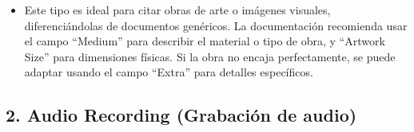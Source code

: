 \documentclass[
  jou,
  floatsintext,
  longtable,
  a4paper,
  nolmodern,
  notxfonts,
  notimes,
  colorlinks=true,linkcolor=blue,citecolor=blue,urlcolor=blue]{apa7}
\providecommand{\tightlist}{%
  \setlength{\itemsep}{0pt}\setlength{\parskip}{0pt}}
\begin{document}
\begin{itemize}
  \begin{itemize}
  \tightlist
  \item
    Este tipo es ideal para citar obras de arte o imágenes visuales,
    diferenciándolas de documentos genéricos. La documentación
    recomienda usar el campo ``Medium'' para describir el material o
    tipo de obra, y ``Artwork Size'' para dimensiones físicas. Si la
    obra no encaja perfectamente, se puede adaptar usando el campo
    ``Extra'' para detalles específicos.
  \end{itemize}
\end{itemize}

\subsection{2. Audio Recording (Grabación de
audio)}\label{audio-recording-grabaciuxf3n-de-audio}
\end{document}

